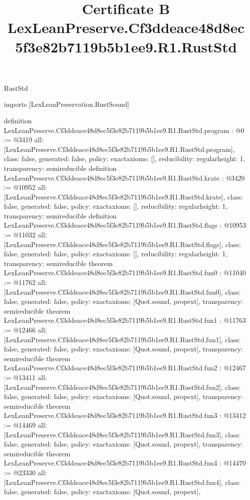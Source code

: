 \begin{lexlean}{RustStd}
\title{Certificate B LexLeanPreserve.Cf3ddeace48d8ec5f3e82b7119b5b1ee9.R1.RustStd}
\begin{coremodule}
imports [LexLeanPreservation.RustSound]

definition LexLeanPreserve.Cf3ddeace48d8ec5f3e82b7119b5b1ee9.R1.RustStd.program : @0 := @3419 {
  all: [LexLeanPreserve.Cf3ddeace48d8ec5f3e82b7119b5b1ee9.R1.RustStd.program],
  class: false,
  generated: false,
  policy: exact{axioms: []},
  reducibility: regular{height: 1},
  transparency: semireducible
}
definition LexLeanPreserve.Cf3ddeace48d8ec5f3e82b7119b5b1ee9.R1.RustStd.krate : @3420 := @10952 {
  all: [LexLeanPreserve.Cf3ddeace48d8ec5f3e82b7119b5b1ee9.R1.RustStd.krate],
  class: false,
  generated: false,
  policy: exact{axioms: []},
  reducibility: regular{height: 1},
  transparency: semireducible
}
definition LexLeanPreserve.Cf3ddeace48d8ec5f3e82b7119b5b1ee9.R1.RustStd.flags : @10953 := @11032 {
  all: [LexLeanPreserve.Cf3ddeace48d8ec5f3e82b7119b5b1ee9.R1.RustStd.flags],
  class: false,
  generated: false,
  policy: exact{axioms: []},
  reducibility: regular{height: 1},
  transparency: semireducible
}
theorem LexLeanPreserve.Cf3ddeace48d8ec5f3e82b7119b5b1ee9.R1.RustStd.fun0 : @11040 := @11762 {
  all: [LexLeanPreserve.Cf3ddeace48d8ec5f3e82b7119b5b1ee9.R1.RustStd.fun0],
  class: false,
  generated: false,
  policy: exact{axioms: [Quot.sound, propext]},
  transparency: semireducible
}
theorem LexLeanPreserve.Cf3ddeace48d8ec5f3e82b7119b5b1ee9.R1.RustStd.fun1 : @11763 := @12466 {
  all: [LexLeanPreserve.Cf3ddeace48d8ec5f3e82b7119b5b1ee9.R1.RustStd.fun1],
  class: false,
  generated: false,
  policy: exact{axioms: [Quot.sound, propext]},
  transparency: semireducible
}
theorem LexLeanPreserve.Cf3ddeace48d8ec5f3e82b7119b5b1ee9.R1.RustStd.fun2 : @12467 := @13411 {
  all: [LexLeanPreserve.Cf3ddeace48d8ec5f3e82b7119b5b1ee9.R1.RustStd.fun2],
  class: false,
  generated: false,
  policy: exact{axioms: [Quot.sound, propext]},
  transparency: semireducible
}
theorem LexLeanPreserve.Cf3ddeace48d8ec5f3e82b7119b5b1ee9.R1.RustStd.fun3 : @13412 := @14469 {
  all: [LexLeanPreserve.Cf3ddeace48d8ec5f3e82b7119b5b1ee9.R1.RustStd.fun3],
  class: false,
  generated: false,
  policy: exact{axioms: [Quot.sound, propext]},
  transparency: semireducible
}
theorem LexLeanPreserve.Cf3ddeace48d8ec5f3e82b7119b5b1ee9.R1.RustStd.fun4 : @14470 := @23330 {
  all: [LexLeanPreserve.Cf3ddeace48d8ec5f3e82b7119b5b1ee9.R1.RustStd.fun4],
  class: false,
  generated: false,
  policy: exact{axioms: [Quot.sound, propext]},
}
\end{coremodule}
\end{lexlean}
